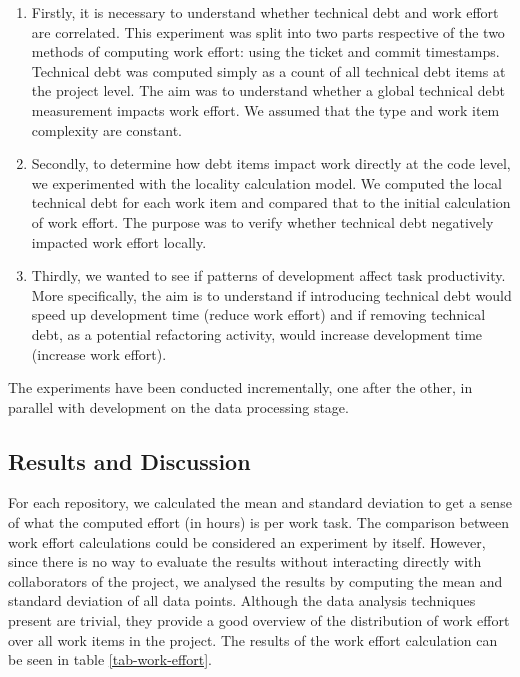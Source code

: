 \documentclass{mpaper}
\begin{document}
\begin{enumerate}
  
  \item Firstly, it is necessary to understand whether technical debt and work
  effort are correlated. This experiment was split into two parts respective of
  the two methods of computing work effort: using the ticket and commit
  timestamps. Technical debt was computed simply as a count of all technical
  debt items at the project level. The aim was to understand whether a global
  technical debt measurement impacts work effort. We assumed that the type and
  work item complexity are constant.

  \item Secondly, to determine how debt items impact work directly at the code
  level, we experimented with the locality calculation model. We computed the
  local technical debt for each work item and compared that to the initial
  calculation of work effort. The purpose was to verify whether technical debt
  negatively impacted work effort locally. 
  
  \item Thirdly, we wanted to see if patterns of development affect task
  productivity. More specifically, the aim is to understand if introducing
  technical debt would speed up development time (reduce work effort) and if
  removing technical debt, as a potential refactoring activity, would increase
  development time (increase work effort).
\end{enumerate}

The experiments have been conducted incrementally, one after the other, in
parallel with development on the data processing stage.  

\subsection{Results and Discussion}
\label{results-discussion}

For each repository, we calculated the mean and standard deviation to get a
sense of what the computed effort (in hours) is per work task. The comparison
between work effort calculations could be considered an experiment by itself.
However, since there is no way to evaluate the results without interacting
directly with collaborators of the project, we analysed the results by computing
the mean and standard deviation of all data points. Although the data analysis
techniques present are trivial, they provide a good overview of the distribution
of work effort over all work items in the project. The results of the work
effort calculation can be seen in table \ref{tab-work-effort}.  
\end{document}
